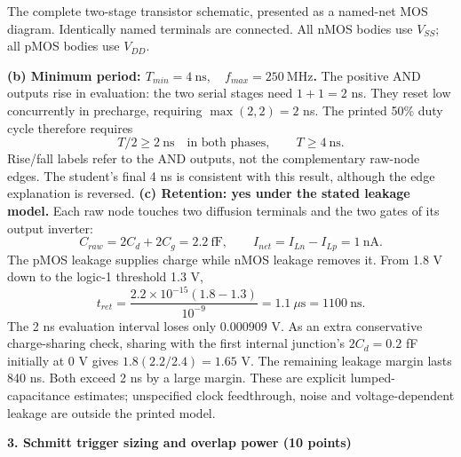 \documentclass[10pt]{article}
\newcommand{\qheading}[1]{\par\medskip\textbf{#1}\par}
\begin{document}
\small The complete two-stage transistor schematic, presented as a named-net MOS diagram. Identically named terminals are connected. All nMOS bodies use $V_{SS}$; all pMOS bodies use $V_{DD}$.\normalsize\par
\textbf{(b) Minimum period: $\boxed{T_{min}=4\ \mathrm{ns},\quad f_{max}=250\ \mathrm{MHz}}$.}
The positive AND outputs rise in evaluation: the two serial stages need $1+1=2$ ns. They reset low concurrently in precharge, requiring $\max(2,2)=2$ ns. The printed 50\% duty cycle therefore requires
\[T/2\ge2\ \mathrm{ns}\quad\text{in both phases},\qquad T\ge4\ \mathrm{ns}.\]
Rise/fall labels refer to the AND outputs, not the complementary raw-node edges. The student's final 4 ns is consistent with this result, although the edge explanation is reversed.
\textbf{(c) Retention: yes under the stated leakage model.}
Each raw node touches two diffusion terminals and the two gates of its output inverter:
\[C_{raw}=2C_d+2C_g=2.2\ \mathrm{fF},\qquad I_{net}=I_{Ln}-I_{Lp}=1\ \mathrm{nA}.\]
The pMOS leakage supplies charge while nMOS leakage removes it. From 1.8 V down to the logic-1 threshold 1.3 V,
\[t_{ret}=\frac{2.2\times10^{-15}(1.8-1.3)}{10^{-9}}=1.1\ \mu\mathrm{s}=1100\ \mathrm{ns}.\]
The 2 ns evaluation interval loses only $0.000909$ V. As an extra conservative charge-sharing check, sharing with the first internal junction's $2C_d=0.2$ fF initially at 0 V gives $1.8(2.2/2.4)=1.65$ V. The remaining leakage margin lasts 840 ns. Both exceed 2 ns by a large margin. These are explicit lumped-capacitance estimates; unspecified clock feedthrough, noise and voltage-dependent leakage are outside the printed model.
\newpage
\qheading{3. Schmitt trigger sizing and overlap power (10 points)}
\end{document}
